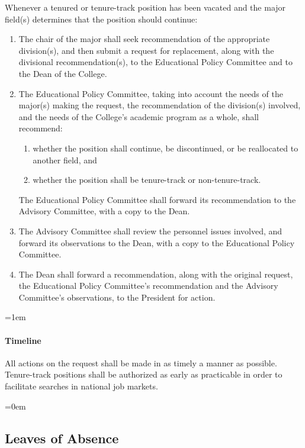 \documentclass{manual}
\let\oldsubsection\subsection
\renewcommand\subsection{\leftskip=0em\oldsubsection}
\let\oldparagraph\paragraph
\renewcommand\paragraph{\leftskip=1em\oldparagraph}
\newcommand{\itemLevelA}{\alph*.}
\newcommand{\itemLevelB}{\arabic*)}
\newcommand{\itemRefA}{\alph*}
\newcommand{\itemRefB}{\arabic*}
\begin{document}
Whenever a tenured or tenure-track position has been vacated and the major field(s) determines that the position should continue:

\begin{enumerate}[label=\itemLevelA,ref=\itemRefA]

\item  The chair of the major shall seek recommendation of the appropriate division(s), and then submit a request for replacement, along with the divisional recommendation(s), to the Educational Policy Committee and to the Dean of the College.


\item  The Educational Policy Committee, taking into account the needs of the major(s) making the request, the recommendation of the division(s) involved, and the needs of the College's academic program as a whole, shall recommend:
\begin{enumerate}[label=\itemLevelB,ref=\itemRefB]


\item whether the position shall continue, be discontinued, or be reallocated to another field, and


\item whether the position shall be tenure-track or non-tenure-track.
\end{enumerate}
The Educational Policy Committee shall forward its recommendation to the Advisory Committee, with a copy to the Dean.


\item The Advisory Committee shall review the personnel issues involved, and forward its observations to the Dean, with a copy to the Educational Policy Committee.


\item The Dean shall forward a recommendation, along with the original request, the Educational Policy Committee's recommendation and the Advisory Committee's observations, to the President for action.
\end{enumerate}


\paragraph{Timeline} 
All actions on the request shall be made in as timely a manner as possible. Tenure-track positions shall be authorized as early as practicable in order to facilitate searches in national job markets.


\subsection{Leaves of Absence}\label{sec:LeavesOfAbsence}
\end{document}
